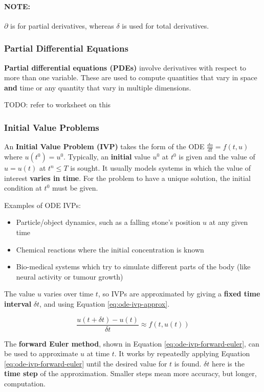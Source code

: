 \documentclass{article}
\begin{document}
\paragraph{\textbf{NOTE: }} $\partial$ is for partial derivatives, whereas $\delta$ is used for total derivatives.

\subsubsection{Partial Differential Equations}

\textbf{Partial differential equations (PDEs)} involve derivatives with respect to more than one variable. These are used to compute quantities that vary in space \textbf{and} time or any quantity that vary in multiple dimensions.

TODO: refer to worksheet on this

\subsubsection{Initial Value Problems}

An \textbf{Initial Value Problem (IVP)} takes the form of the ODE $\frac{du}{dt} = f(t, u)$ where $u(t^0) = u^0$. Typically, an \textbf{initial} value $u^0$ at $t^0$ is given and the value of $u = u(t)$ at $t^n \leq T$ is sought. It usually models systems in which the value of interest \textbf{varies in time}. For the problem to have a unique solution, the initial condition at $t^0$ must be given.

Examples of ODE IVPs:
\begin{itemize}
	\item Particle/object dynamics, such as a falling stone's position $u$ at any given time
	\item Chemical reactions where the initial concentration is known
	\item Bio-medical systems which try to simulate different parts of the body (like neural activity or tumour growth)
\end{itemize}

The value $u$ varies over time $t$, so IVPs are approximated by giving a \textbf{fixed time interval} $\delta t$, and using Equation \ref{eq:ode-ivp-approx}. 

\begin{equation}
	\frac{u(t + \delta t) - u(t)}{\delta t} \approx f(t, u(t))
	\label{eq:ode-ivp-approx}
\end{equation}

The \textbf{forward Euler method}, shown in Equation \ref{eq:ode-ivp-forward-euler}, can be used to approximate $u$ at time $t$. It works by repeatedly applying Equation \ref{eq:ode-ivp-forward-euler} until the desired value for $t$ is found. $\delta t$ here is the \textbf{time step} of the approximation. Smaller steps mean more accuracy, but longer, computation.
\end{document}
